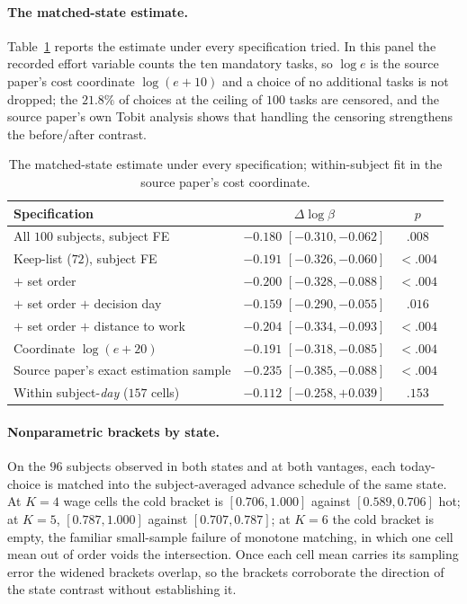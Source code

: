 \documentclass[11pt,a4paper]{article}
\theoremstyle{plain}
\theoremstyle{definition}
\begin{document}
\paragraph{The matched-state estimate.} Table~\ref{tab:robmatched} reports the estimate under every specification
tried. In this panel the recorded effort variable counts the ten mandatory tasks, so $\log e$ is the source paper's
cost coordinate $\log(e+10)$ and a choice of no additional tasks is not dropped; the $21.8\%$ of choices at the
ceiling of $100$ tasks are censored, and the source paper's own Tobit analysis shows that handling the censoring
strengthens the before/after contrast.

\begin{table}[H]\centering
\caption{The matched-state estimate under every specification; within-subject fit in the source paper's cost
coordinate.}
\label{tab:robmatched}
{\small
\begin{tabular}{>{\raggedright\arraybackslash}p{7.0cm}cc}
\toprule
Specification & $\Delta\log\beta$ & $p$ \\
\midrule
All $100$ subjects, subject FE & $\mathbf{-0.180}$ $[-0.310,-0.062]$ & $.008$ \\
Keep-list ($72$), subject FE & $-0.191$ $[-0.326,-0.060]$ & $<.004$ \\
$+$ set order & $-0.200$ $[-0.328,-0.088]$ & $<.004$ \\
$+$ set order $+$ decision day & $-0.159$ $[-0.290,-0.055]$ & $.016$ \\
$+$ set order $+$ distance to work & $-0.204$ $[-0.334,-0.093]$ & $<.004$ \\
Coordinate $\log(e+20)$ & $-0.191$ $[-0.318,-0.085]$ & $<.004$ \\
Source paper's exact estimation sample & $-0.235$ $[-0.385,-0.088]$ & $<.004$ \\
Within subject-\emph{day} ($157$ cells) & $-0.112$ $[-0.258,+0.039]$ & $.153$ \\
\bottomrule
\end{tabular}}
\end{table}

\paragraph{Nonparametric brackets by state.} On the $96$ subjects observed in both states and at both vantages, each
today-choice is matched into the subject-averaged advance schedule of the same state. At $K=4$ wage cells the cold
bracket is $[0.706,1.000]$ against $[0.589,0.706]$ hot; at $K=5$, $[0.787,1.000]$ against $[0.707,0.787]$; at $K=6$
the cold bracket is empty, the familiar small-sample failure of monotone matching, in which one cell mean out of order
voids the intersection. Once each cell mean carries its sampling error the widened brackets overlap, so the brackets
corroborate the direction of the state contrast without establishing it.
\end{document}
